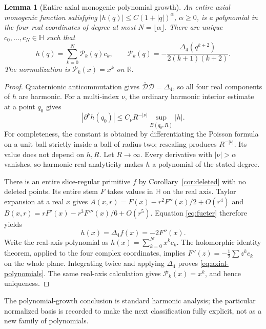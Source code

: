 \documentclass[11pt,a4paper]{article}
\numberwithin{equation}{section}
\newtheorem{lemma}[theorem]{Lemma}
\theoremstyle{definition}
\theoremstyle{remark}
\newcommand{\R}{\mathbb R}
\newcommand{\HH}{\mathbb H}
\newcommand{\Fu}{\Delta_4}
\newcommand{\Dir}{\mathcal D}
\begin{document}
\begin{lemma}[Entire axial monogenic polynomial growth]
\label{lem:polynomial}
An entire axial monogenic function satisfying
$|h(q)|\le C(1+|q|)^\alpha$, $\alpha\ge0$, is a polynomial in the four
real coordinates of degree at most $N=\lfloor\alpha\rfloor$.
There are unique $c_0,\ldots,c_N\in\HH$ such that
\begin{equation}
 h(q)=\sum_{k=0}^N\mathcal P_k(q)c_k,
 \qquad
 \mathcal P_k(q)=-\frac{\Fu(q^{k+2})}{2(k+1)(k+2)}.
 \label{eq:axial-polynomials}
\end{equation}
The normalization is $\mathcal P_k(x)=x^k$ on $\R$.
\end{lemma}
\begin{proof}
Quaternionic anticommutation gives
$\overline{\Dir}\Dir=\Fu$, so all four real components of $h$ are
harmonic. For a multi-index $\nu$, the ordinary harmonic interior
estimate at a point $q_0$ gives
\[
 |\partial^\nu h(q_0)|\le C_\nu R^{-|\nu|}
                  \sup_{B(q_0,R)}|h|.
\]
For completeness, the constant is obtained by differentiating the
Poisson formula on a unit ball strictly inside a ball of radius two;
rescaling produces $R^{-|\nu|}$. Its value does not depend on $h,R$.
Let $R\to\infty$. Every derivative with $|\nu|>\alpha$ vanishes,
so harmonic real analyticity makes $h$ a polynomial of the stated degree.

There is an entire slice-regular primitive $f$ by
Corollary~\ref{cor:deleted} with no deleted points. Its entire stem $F$
takes values in $\HH$ on the real axis. Taylor expansion at a real $x$ gives
$A(x,r)=F(x)-r^2F''(x)/2+O(r^4)$ and
$B(x,r)=rF'(x)-r^3F'''(x)/6+O(r^5)$.
Equation \eqref{eq:fueter} therefore yields
\begin{equation}
 h(x)=\Fu f(x)=-2F''(x).\label{eq:real-trace}
\end{equation}
Write the real-axis polynomial as $h(x)=\sum_{k=0}^Nx^kc_k$.
The holomorphic identity theorem, applied to the four complex
coordinates, implies $F''(z)=-\tfrac12\sum z^kc_k$ on the whole plane.
Integrating twice and applying $\Fu$ proves
\eqref{eq:axial-polynomials}. The same real-axis calculation gives
$\mathcal P_k(x)=x^k$, and hence uniqueness.
\end{proof}
The polynomial-growth conclusion is standard harmonic analysis; the
particular normalized basis is recorded to make the next classification
fully explicit, not as a new family of polynomials.
\end{document}
